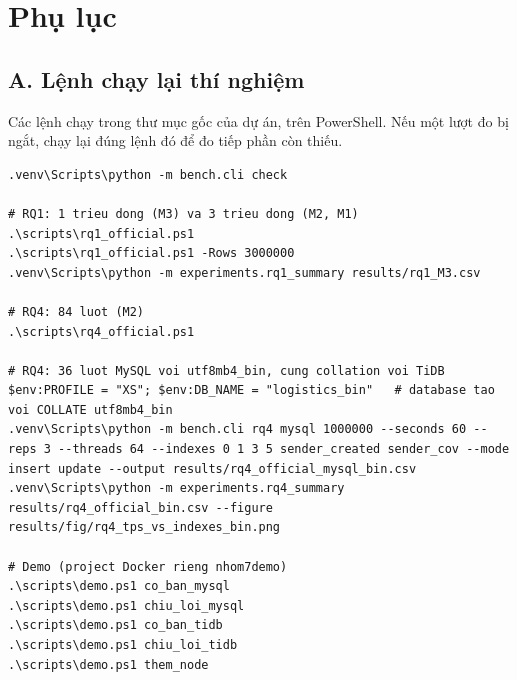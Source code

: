 \clearpage
\section*{Phụ lục}

\subsection*{A. Lệnh chạy lại thí nghiệm}

Các lệnh chạy trong thư mục gốc của dự án, trên PowerShell. Nếu một lượt đo bị ngắt, chạy lại đúng lệnh đó để đo tiếp phần còn thiếu.

\begin{lstlisting}[caption={Lệnh PowerShell chạy lại các thí nghiệm}]
.venv\Scripts\python -m bench.cli check

# RQ1: 1 trieu dong (M3) va 3 trieu dong (M2, M1)
.\scripts\rq1_official.ps1
.\scripts\rq1_official.ps1 -Rows 3000000
.venv\Scripts\python -m experiments.rq1_summary results/rq1_M3.csv

# RQ4: 84 luot (M2)
.\scripts\rq4_official.ps1

# RQ4: 36 luot MySQL voi utf8mb4_bin, cung collation voi TiDB
$env:PROFILE = "XS"; $env:DB_NAME = "logistics_bin"   # database tao voi COLLATE utf8mb4_bin
.venv\Scripts\python -m bench.cli rq4 mysql 1000000 --seconds 60 --reps 3 --threads 64 --indexes 0 1 3 5 sender_created sender_cov --mode insert update --output results/rq4_official_mysql_bin.csv
.venv\Scripts\python -m experiments.rq4_summary results/rq4_official_bin.csv --figure results/fig/rq4_tps_vs_indexes_bin.png

# Demo (project Docker rieng nhom7demo)
.\scripts\demo.ps1 co_ban_mysql
.\scripts\demo.ps1 chiu_loi_mysql
.\scripts\demo.ps1 co_ban_tidb
.\scripts\demo.ps1 chiu_loi_tidb
.\scripts\demo.ps1 them_node
\end{lstlisting}

